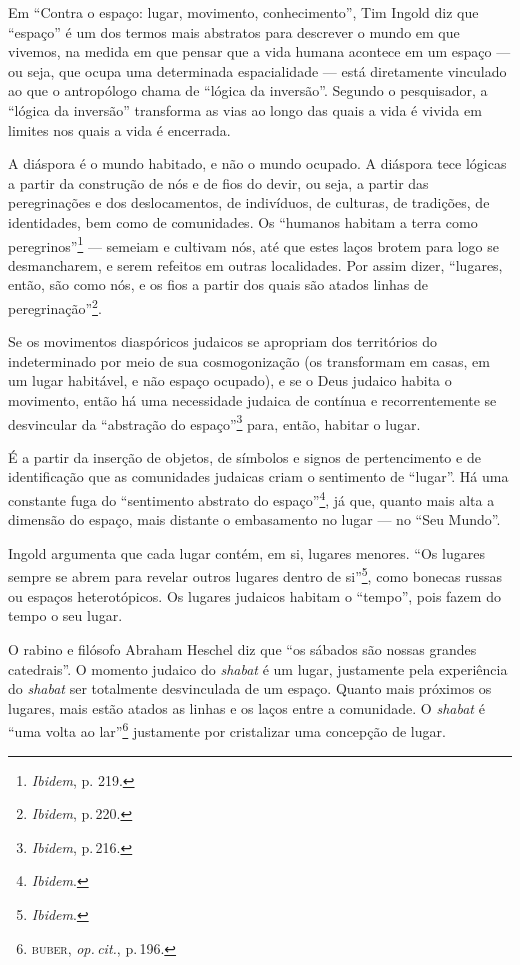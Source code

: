 \begin{center}\end{center}

\noindent{}Em ``Contra o espaço: lugar, movimento, conhecimento'', Tim Ingold diz
que ``espaço'' é um dos termos mais abstratos para descrever o mundo em
que vivemos, na medida em que pensar que a vida humana acontece em um
espaço --- ou seja, que ocupa uma determinada espacialidade --- está
diretamente vinculado ao que o antropólogo chama de ``lógica da
inversão''. Segundo o pesquisador, a ``lógica da inversão''
transforma as vias ao longo das quais a vida é vivida em limites nos
quais a vida é encerrada.

A diáspora é o mundo habitado, e não o mundo ocupado. A diáspora tece
lógicas a partir da construção de nós e de fios do devir, ou seja, a
partir das peregrinações e dos deslocamentos, de indivíduos, de
culturas, de tradições, de identidades, bem como de comunidades. Os
``humanos habitam a terra como peregrinos''\footnote{\emph{Ibidem}, p.
  219.} --- semeiam e cultivam nós, até que estes laços brotem para logo
se desmancharem, e serem refeitos em outras localidades. Por assim
dizer, ``lugares, então, são como nós, e os fios a partir dos
quais são atados linhas de peregrinação''\footnote{\emph{Ibidem}, p.\,220.}.

Se os movimentos diaspóricos judaicos se apropriam dos territórios do
indeterminado por meio de sua cosmogonização (os transformam em casas,
em um lugar habitável, e não espaço ocupado), e se o Deus judaico habita
o movimento, então há uma necessidade judaica de contínua e
recorrentemente se desvincular da ``abstração do
espaço''\footnote{\emph{Ibidem}, p.\,216.} para, então, habitar o lugar.

É a partir da inserção de objetos, de símbolos e signos de pertencimento
e de identificação que as comunidades judaicas criam o sentimento de
``lugar''. Há uma constante fuga do ``sentimento abstrato do
espaço''\footnote{\emph{Ibidem}.}, já que, quanto mais alta a dimensão do
espaço, mais distante o embasamento no lugar --- no ``Seu Mundo''.

Ingold argumenta que cada lugar contém, em si, lugares menores.
``Os lugares sempre se abrem para revelar outros lugares dentro de
si''\footnote{\emph{Ibidem}.}, como bonecas russas ou espaços heterotópicos.
Os lugares judaicos habitam o ``tempo'', pois fazem do tempo o seu lugar.

O rabino e filósofo Abraham Heschel diz que ``os sábados são
nossas grandes catedrais''. O momento judaico do \emph{shabat} é um
lugar, justamente pela experiência do \emph{shabat} ser totalmente
desvinculada de um espaço. Quanto mais próximos os lugares, mais estão
atados as linhas e os laços entre a comunidade. O \emph{shabat} é
``uma volta ao lar''\footnote{\textsc{buber}, \emph{op.\,cit.}, p.\,196.}
justamente por cristalizar uma concepção de lugar.

